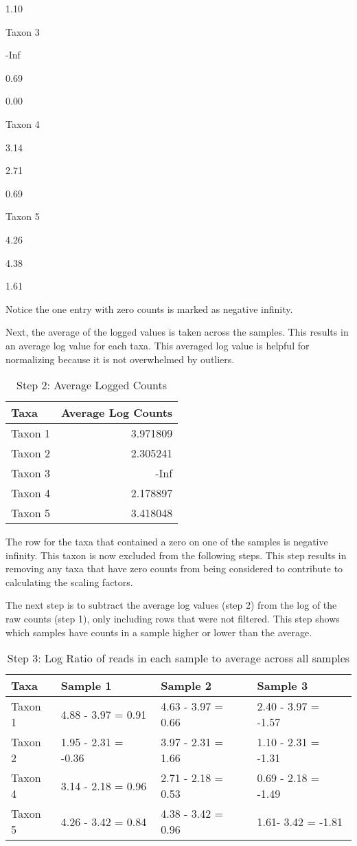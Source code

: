 \documentclass[
]{book}
\begin{document}
1.10

Taxon 3

-Inf

0.69

0.00

Taxon 4

3.14

2.71

0.69

Taxon 5

4.26

4.38

1.61

Notice the one entry with zero counts is marked as negative infinity.

Next, the average of the logged values is taken across the samples. This results in an average log value for each taxa. This averaged log value is helpful for normalizing because it is not overwhelmed by outliers.

\begin{table}

\caption{\label{tab:unnamed-chunk-22}Step 2: Average Logged Counts}
\centering
\begin{tabular}[t]{l|r}
\hline
Taxa & Average Log Counts\\
\hline
Taxon 1 & 3.971809\\
\hline
Taxon 2 & 2.305241\\
\hline
Taxon 3 & -Inf\\
\hline
Taxon 4 & 2.178897\\
\hline
Taxon 5 & 3.418048\\
\hline
\end{tabular}
\end{table}

The row for the taxa that contained a zero on one of the samples is negative infinity. This taxon is now excluded from the following steps. This step results in removing any taxa that have zero counts from being considered to contribute to calculating the scaling factors.

The next step is to subtract the average log values (step 2) from the log of the raw counts (step 1), only including rows that were not filtered. This step shows which samples have counts in a sample higher or lower than the average.

\begin{table}

\caption{\label{tab:unnamed-chunk-23}Step 3: Log Ratio of reads in each sample to average across all samples}
\centering
\begin{tabular}[t]{l|l|l|l}
\hline
Taxa & Sample 1 & Sample 2 & Sample 3\\
\hline
Taxon 1 & 4.88 - 3.97 = 0.91 & 4.63 - 3.97 = 0.66 & 2.40 - 3.97 = -1.57\\
\hline
Taxon 2 & 1.95 - 2.31 = -0.36 & 3.97 - 2.31 = 1.66 & 1.10 - 2.31 = -1.31\\
\hline
Taxon 4 & 3.14 - 2.18 = 0.96 & 2.71 - 2.18 = 0.53 & 0.69 - 2.18 = -1.49\\
\hline
Taxon 5 & 4.26 - 3.42 = 0.84 & 4.38 - 3.42 = 0.96 & 1.61- 3.42 = -1.81\\
\hline
\end{tabular}
\end{table}
\end{document}
